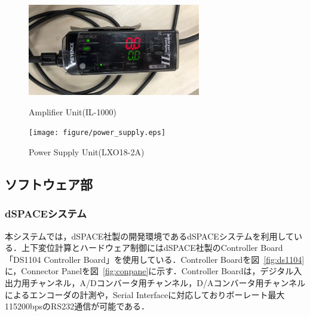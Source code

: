 \documentclass[a4paper,12pt]{article_vdlab_sotsuron}
\begin{document}
\vspace*{10mm}
\begin{figure}[htp]
  \begin{minipage}{0.5\textwidth}
    \begin{center}
      \includegraphics[height=40mm]{figure/amp.eps}
      \vspace*{3mm}
      \caption{Amplifier Unit(IL-1000)}
      \label{fig:il_1500}
    \end{center}
  \end{minipage}
  \begin{minipage}{0.5\textwidth}
    \begin{center}
      \texttt{[image: figure/power\_supply.eps]}
      \vspace*{3mm}
      \caption{Power Supply Unit(LXO18-2A)}
      \label{fig:lxo18_2a}
    \end{center}
  \end{minipage}
\end{figure}

\subsection{ソフトウェア部}
\subsubsection{dSPACEシステム}
本システムでは，dSPACE社製の開発環境であるdSPACEシステムを利用している．上下変位計算とハードウェア制御にはdSPACE社製のController Board「DS1104 Controller Board」を使用している．Controller Boardを図~\ref{fig:ds1104}に，Connector Panelを図~\ref{fig:conpane}に示す．Controller Boardは，デジタル入出力用チャンネル，A/Dコンバータ用チャンネル，D/Aコンバータ用チャンネルによるエンコーダの計測や，Serial Interfaceに対応しておりボーレート最大115200bpsのRS232通信が可能である．
\end{document}
